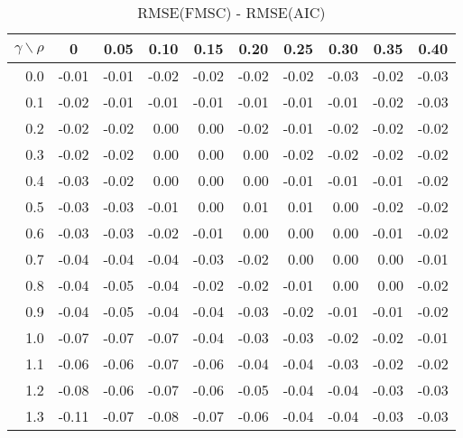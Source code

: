 \documentclass[12pt]{article}
\begin{document}
%
\begin{table}[!tbp]
\caption{RMSE(FMSC) - RMSE(AIC)}
 \begin{center}
 \begin{tabular}{r|rrrrrrrrr}\hline\hline
\multicolumn{1}{c|}{$\gamma\backslash\rho$}&\multicolumn{1}{c}{0}&\multicolumn{1}{c}{0.05}&\multicolumn{1}{c}{0.10}&\multicolumn{1}{c}{0.15}&\multicolumn{1}{c}{0.20}&\multicolumn{1}{c}{0.25}&\multicolumn{1}{c}{0.30}&\multicolumn{1}{c}{0.35}&\multicolumn{1}{c}{0.40}\tabularnewline
\hline
0.0&-0.01&-0.01&-0.02&-0.02&-0.02&-0.02&-0.03&-0.02&-0.03\tabularnewline
0.1&-0.02&-0.01&-0.01&-0.01&-0.01&-0.01&-0.01&-0.02&-0.03\tabularnewline
0.2&-0.02&-0.02& 0.00& 0.00&-0.02&-0.01&-0.02&-0.02&-0.02\tabularnewline
0.3&-0.02&-0.02& 0.00& 0.00& 0.00&-0.02&-0.02&-0.02&-0.02\tabularnewline
0.4&-0.03&-0.02& 0.00& 0.00& 0.00&-0.01&-0.01&-0.01&-0.02\tabularnewline
0.5&-0.03&-0.03&-0.01& 0.00& 0.01& 0.01& 0.00&-0.02&-0.02\tabularnewline
0.6&-0.03&-0.03&-0.02&-0.01& 0.00& 0.00& 0.00&-0.01&-0.02\tabularnewline
0.7&-0.04&-0.04&-0.04&-0.03&-0.02& 0.00& 0.00& 0.00&-0.01\tabularnewline
0.8&-0.04&-0.05&-0.04&-0.02&-0.02&-0.01& 0.00& 0.00&-0.02\tabularnewline
0.9&-0.04&-0.05&-0.04&-0.04&-0.03&-0.02&-0.01&-0.01&-0.02\tabularnewline
1.0&-0.07&-0.07&-0.07&-0.04&-0.03&-0.03&-0.02&-0.02&-0.01\tabularnewline
1.1&-0.06&-0.06&-0.07&-0.06&-0.04&-0.04&-0.03&-0.02&-0.02\tabularnewline
1.2&-0.08&-0.06&-0.07&-0.06&-0.05&-0.04&-0.04&-0.03&-0.03\tabularnewline
1.3&-0.11&-0.07&-0.08&-0.07&-0.06&-0.04&-0.04&-0.03&-0.03\tabularnewline
\hline
\end{tabular}

\end{center}

\end{table}
\end{document}
